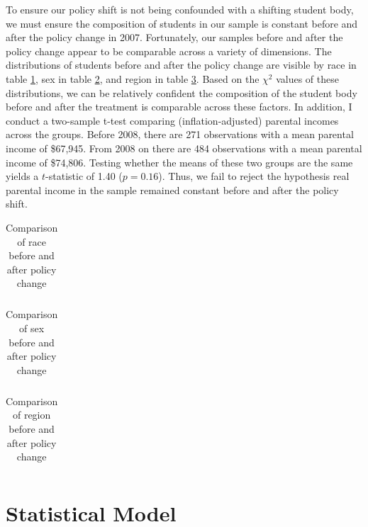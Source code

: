 \documentclass[12pt]{article}
\begin{document}
	To ensure our policy shift is not being confounded with a shifting student body, we must ensure the composition of students in our sample is constant before and after the policy change in 2007. Fortunately, our samples before and after the policy change appear to be comparable across a variety of dimensions. The distributions of students before and after the policy change are visible by race in table \ref{racecomp}, sex in table \ref{sexcomp}, and region in table \ref{regioncomp}. Based on the $\chi^2$ values of these distributions, we can be relatively confident the composition of the student body before and after the treatment is comparable across these factors. In addition, I conduct a two-sample t-test comparing (inflation-adjusted) parental incomes across the groups. Before 2008, there are 271 observations with a mean parental income of \$67,945. From 2008 on there are 484 observations with a mean parental income of \$74,806. Testing whether the means of these two groups are the same yields a $t$-statistic of 1.40 ($p = 0.16$). Thus, we fail to reject the hypothesis real parental income in the sample remained constant before and after the policy shift. 
	
{
	\begin{table}
		\centering
		\caption{Comparison of race before and after policy change}
		\begin{tabular}{lrrrrrrrr}
						
		\end{tabular}
		\label{racecomp}
	\end{table}

	\begin{table}
		\centering
		\caption{Comparison of sex before and after policy change}
		\begin{tabular}{lrrrrrr}
			
		\end{tabular}
		\label{sexcomp}
	\end{table}

	\begin{table}
		\centering
		\caption{Comparison of region before and after policy change}
		\begin{tabular}{lrrrrrrrrrr}
			
		\end{tabular}
		\label{regioncomp}
	\end{table}
}
	
	\section{Statistical Model}
	
\end{document}
